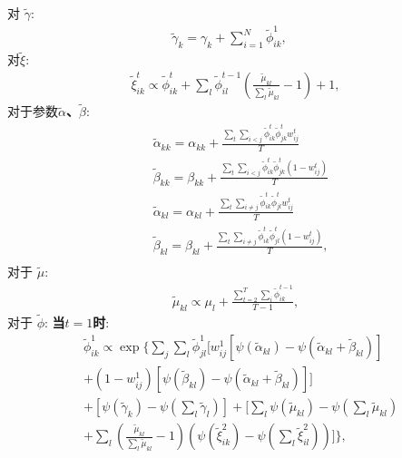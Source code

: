 对\textbf{ $\widetilde{\gamma}$}:
\begin{equation}
\label{eq4}
\begin{split}
\widetilde{\gamma}_k = \gamma_k + \sum_{i=1}^N \widetilde{\phi}_{ik}^1, \quad
\end{split}
\end{equation}
对\textbf{$\widetilde{\xi}$}:
\begin{equation}
\label{eq5}
\begin{split}
\widetilde{\xi}_{ik}^t \propto \widetilde{\phi}_{ik}^t + \sum_l \widetilde{\phi}_{il}^{t-1}(\frac{\widetilde{\mu}_{kl}}{\sum_l \widetilde{\mu}_{kl}} - 1) + 1 ,
\end{split}
\end{equation}
对于参数\textbf{$\widetilde{\alpha}$、$\widetilde{\beta}$}:
\begin{equation}
\label{eq6}
\begin{split}
& \widetilde{\alpha}_{kk} = \alpha_{kk} + \frac{\sum_t \sum_{i<j} \widetilde{\phi}_{ik}^t \widetilde{\phi}_{jk}^t w_{ij}^t}{T}  \\
& \widetilde{\beta}_{kk} = \beta_{kk} + \frac{\sum_t \sum_{i<j} \widetilde{\phi}_{ik}^t \widetilde{\phi}_{jk}^t (1-w_{ij}^t)}{T} \\
& \widetilde{\alpha}_{kl} = \alpha_{kl} + \frac{\sum_t \sum_{i \neq j} \widetilde{\phi}_{ik}^t \widetilde{\phi}_{jl}^t w_{ij}^t}{T} \\
& \widetilde{\beta}_{kl} = \beta_{kl} + \frac{\sum_t \sum_{i \neq j} \widetilde{\phi}_{ik}^t \widetilde{\phi}_{jl}^t (1-w_{ij}^t)}{T}  ,\\
\end{split}
\end{equation}
对于\textbf{ $\widetilde{\mu}$}:
\begin{equation}
\label{eq7}
\begin{split}
\widetilde{\mu}_{kl} \propto \mu_l + \frac{\sum_{t=2}^T \sum_i \widetilde{\phi}_{ik}^{t-1}}{T-1} ,
\end{split}
\end{equation}
对于 \textbf{$\widetilde{\phi}$}:
\textbf{当$t=1$时}:
\begin{equation}
\label{eq8}
\begin{split}
&\widetilde{\phi}_{ik}^1 \propto \exp\{\sum_j \sum_l \widetilde{\phi}_{jl}^1 [w_{ij}^1[\psi(\widetilde{\alpha}_{kl})-\psi(\widetilde{\alpha}_{kl}+\widetilde{\beta}_{kl})]\\
 &+ (1-w_{ij}^1)[\psi(\widetilde{\beta}_{kl}) - \psi(\widetilde{\alpha}_{kl}+\widetilde{\beta}_{kl})] ]   \\
& +[\psi(\widetilde{\gamma}_k)-\psi(\sum_l \widetilde{\gamma}_l) ] +[\sum_l \psi(\widetilde{\mu}_{kl}) - \psi(\sum_l \widetilde{\mu}_{kl}) \\
&+ \sum_l (\frac{\widetilde{\mu}_{kl}}{\sum_l \widetilde{\mu}_{kl}}-1)(\psi (\widetilde{\xi}_{ik}^2) - \psi(\sum_l \widetilde{\xi}_{il}^2))]  \} ,\\
\end{split}
\end{equation}

